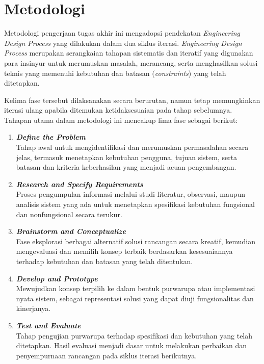 \section{Metodologi}
Metodologi pengerjaan tugas akhir ini mengadopsi pendekatan \textit{Engineering Design Process} yang dilakukan dalam dua siklus iterasi. \textit{Engineering Design Process} merupakan serangkaian tahapan sistematis dan iteratif yang digunakan para insinyur untuk merumuskan masalah, merancang, serta menghasilkan solusi teknis yang memenuhi kebutuhan dan batasan (\textit{constraints}) yang telah ditetapkan.

Kelima fase tersebut dilaksanakan secara berurutan, namun tetap memungkinkan iterasi ulang apabila ditemukan ketidaksesuaian pada tahap sebelumnya. Tahapan utama dalam metodologi ini mencakup lima fase sebagai berikut:
\begin{enumerate}
\item \textbf{\textit{Define the Problem}}\\Tahap awal untuk mengidentifikasi dan merumuskan permasalahan secara jelas, termasuk menetapkan kebutuhan pengguna, tujuan sistem, serta batasan dan kriteria keberhasilan yang menjadi acuan pengembangan.
\item \textbf{\textit{Research and Specify Requirements}}\\Proses pengumpulan informasi melalui studi literatur, observasi, maupun analisis sistem yang ada untuk menetapkan spesifikasi kebutuhan fungsional dan nonfungsional secara terukur.
\item \textbf{\textit{Brainstorm and Conceptualize}}\\Fase eksplorasi berbagai alternatif solusi rancangan secara kreatif, kemudian mengevaluasi dan memilih konsep terbaik berdasarkan kesesuaiannya terhadap kebutuhan dan batasan yang telah ditentukan.
\item \textbf{\textit{Develop and Prototype}}\\Mewujudkan konsep terpilih ke dalam bentuk purwarupa atau implementasi nyata sistem, sebagai representasi solusi yang dapat diuji fungsionalitas dan kinerjanya.
\item \textbf{\textit{Test and Evaluate}}\\Tahap pengujian purwarupa terhadap spesifikasi dan kebutuhan yang telah ditetapkan. Hasil evaluasi menjadi dasar untuk melakukan perbaikan dan penyempurnaan rancangan pada siklus iterasi berikutnya.
\end{enumerate}

